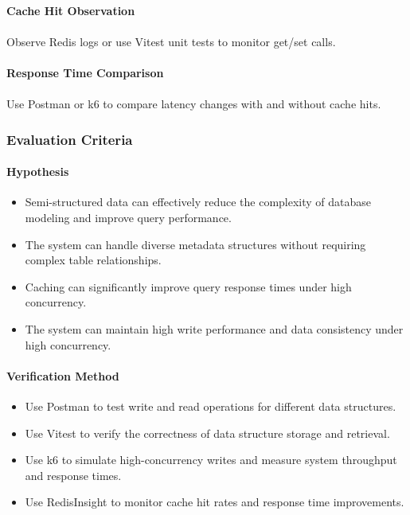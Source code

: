 \documentclass{article}
\begin{document}
\paragraph{Cache Hit Observation}
\paragraph{}
Observe Redis logs or use Vitest unit tests to monitor get/set calls.

\paragraph{Response Time Comparison}
\paragraph{}
Use Postman or k6 to compare latency changes with and without cache hits.

\subsubsection{Evaluation Criteria}

\paragraph{Hypothesis} 
\begin{itemize}
    \item Semi-structured data can effectively reduce the complexity of database modeling and improve query performance.
    \item The system can handle diverse metadata structures without requiring complex table relationships.
    \item Caching can significantly improve query response times under high concurrency.
    \item The system can maintain high write performance and data consistency under high concurrency.
\end{itemize}

\paragraph{Verification Method} 
\begin{itemize}
    \item Use Postman to test write and read operations for different data structures.
    \item Use Vitest to verify the correctness of data structure storage and retrieval.
    \item Use k6 to simulate high-concurrency writes and measure system throughput and response times.
    \item Use RedisInsight to monitor cache hit rates and response time improvements.
\end{itemize}
\end{document}
